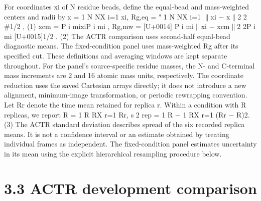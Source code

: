 \documentclass[11pt]{article}
\begin{document}
For coordinates xi of N residue beads, define the equal-bead and mass-weighted centers and radii
by
x = 1
N
NX
i=1
xi, Rg,eq =
"
1
N
NX
i=1
\ensuremath{\parallel}xi \ensuremath{-} x\ensuremath{\parallel}2
2
\#1/2
, (1)
xcm =
P
i mixiP
i mi
, Rg,mw =
[U+0014] P
i mi\ensuremath{\parallel}xi \ensuremath{-} xcm\ensuremath{\parallel}2
2P
i mi
[U+0015]1/2
. (2)
The ACTR comparison uses second-half equal-bead diagnostic means. The fixed-condition panel
uses mass-weighted Rg after its specified cut. These definitions and averaging windows are kept
separate throughout. For the panel’s source-specific residue masses, the N- and C-terminal mass
increments are 2 and 16 atomic mass units, respectively. The coordinate reduction uses the saved
Cartesian arrays directly; it does not introduce a new alignment, minimum-image transformation,
or periodic rewrapping convention.
Let Rr denote the time mean retained for replica r. Within a condition with R replicas, we
report
R = 1
R
RX
r=1
Rr, s 2
rep = 1
R \ensuremath{-} 1
RX
r=1
(Rr \ensuremath{-} R)2. (3)
The ACTR standard deviation describes spread of the six recorded replica means. It is not a
confidence interval or an estimate obtained by treating individual frames as independent. The
fixed-condition panel estimates uncertainty in its mean using the explicit hierarchical resampling
procedure below.

\section*{3.3 ACTR development comparison}
\end{document}
